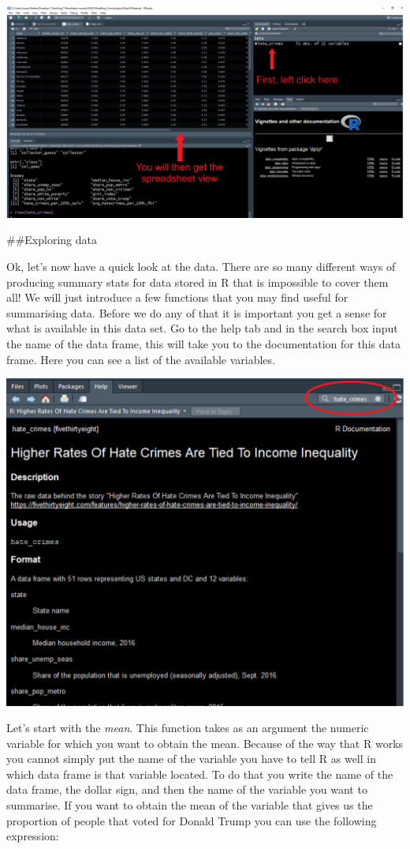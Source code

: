 \documentclass[]{book}
\theoremstyle{definition}
\theoremstyle{definition}
\theoremstyle{definition}
\theoremstyle{remark}
\begin{document}
\includegraphics{imgs/dataview.png}

\#\#Exploring data

Ok, let's now have a quick look at the data. There are so many different
ways of producing summary stats for data stored in R that is impossible
to cover them all! We will just introduce a few functions that you may
find useful for summarising data. Before we do any of that it is
important you get a sense for what is available in this data set. Go to
the help tab and in the search box input the name of the data frame,
this will take you to the documentation for this data frame. Here you
can see a list of the available variables.

\includegraphics{imgs/codebook.png}

Let's start with the \emph{mean}. This function takes as an argument the
numeric variable for which you want to obtain the mean. Because of the
way that R works you cannot simply put the name of the variable you have
to tell R as well in which data frame is that variable located. To do
that you write the name of the data frame, the dollar sign, and then the
name of the variable you want to summarise. If you want to obtain the
mean of the variable that gives us the proportion of people that voted
for Donald Trump you can use the following expression:
\end{document}
